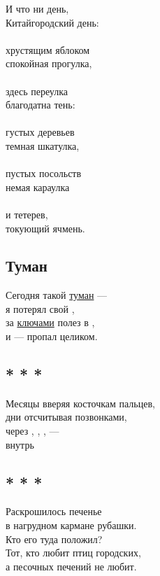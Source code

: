 \documentclass[12pt,a5paper]{report}
\begin{document}
И что ни день,\\
Китайгородский день:\\
\\
хрустящим яблоком\\
спокойная прогулка,\\
\\
здесь переулка\\
благодатна тень:\\
\\
густых деревьев\\
темная шкатулка,\\
\\
пустых посольств\\
немая караулка\\
\\
и тетерев,\\
токующий ячмень.
\newpage

\subsection{Туман}
\label{tuman}
Сегодня такой \hyperref[peski]{туман} ---\\
я потерял свой ,\\

за \hyperref[zevs]{ключами} полез в ,\\
и --- пропал целиком.\\


\newpage
\subsection[<<Месяцы вверяя...>>]{* * *}
\label{paperstone}
Месяцы вверяя косточкам пальцев,\\
дни отсчитывая позвонками,\\
через , \hyperref[schenki]{}, , ---\\
внутрь 

\newpage
\subsection[<<Раскрошилось печенье...>>]{* * *}
Раскрошилось печенье \\
в нагрудном кармане рубашки. \\
Кто его туда положил? \\

Тот, кто любит птиц городских, \\
а песочных печений не любит.\\
\end{document}

